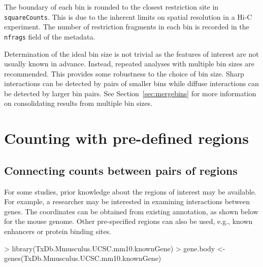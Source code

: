 \documentclass[12pt]{report}
\renewenvironment{Schunk}{\vspace{0pt}}{\vspace{0pt}}
\newcommand{\code}[1]{{\small\texttt{#1}}}
\begin{document}
The boundary of each bin is rounded to the closest restriction site in \code{squareCounts}.
This is due to the inherent limits on spatial resolution in a Hi-C experiment.
The number of restriction fragments in each bin is recorded in the \code{nfrags} field of the metadata.

Determination of the ideal bin size is not trivial as the features of interest are not usually known in advance.
Instead, repeated analyses with multiple bin sizes are recommended.
This provides some robustness to the choice of bin size.
Sharp interactions can be detected by pairs of smaller bins while diffuse interactions can be detected by larger bin pairs.
See Section~\ref{sec:mergebins} for more information on consolidating results from multiple bin sizes.


\section{Counting with pre-defined regions}

\subsection{Connecting counts between pairs of regions}
For some studies, prior knowledge about the regions of interest may be available.
For example, a researcher may be interested in examining interactions between genes.
The coordinates can be obtained from existing annotation, as shown below for the mouse genome.
Other pre-specified regions can also be used, e.g., known enhancers or protein binding sites.

\begin{Schunk}
\begin{Sinput}
> library(TxDb.Mmusculus.UCSC.mm10.knownGene)
> gene.body <- genes(TxDb.Mmusculus.UCSC.mm10.knownGene)
\end{Sinput}
\end{Schunk}
\end{document}
